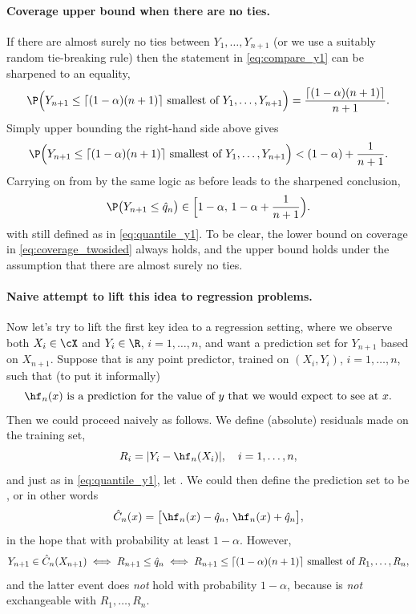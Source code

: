 \documentclass{article}
\begin{document}
\paragraph{Coverage upper bound when there are no ties.}

If there are almost surely no ties between $Y_1,\dots,Y_{n+1}$ (or we use a
suitably random tie-breaking rule) then the statement in \eqref{eq:compare_y1}
can be sharpened to an equality,  
\begin{equation}
\label{eq:compare_y3}
\P\Big( \text{$Y_{n+1} \leq \lceil (1-\alpha)(n+1) \rceil$ smallest of
  $Y_1,\dots,Y_{n+1}$} \Big) = \frac{\lceil (1-\alpha)(n+1) \rceil}{n+1}.
\end{equation}
Simply upper bounding the right-hand side above gives
\begin{equation}
\label{eq:compare_y4}
\P\Big( \text{$Y_{n+1} \leq \lceil (1-\alpha)(n+1) \rceil$ smallest of
  $Y_1,\dots,Y_{n+1}$} \Big) < (1-\alpha) + \frac{1}{n+1}.
\end{equation}
Carrying on from by the same logic as before leads to the sharpened conclusion, 
\begin{equation}
\label{eq:coverage_twosided}
\P\big( Y_{n+1} \leq \hq_n \big) \in \Big[ 1-\alpha, \, 1-\alpha + \frac{1}{n+1}
\Big).  
\end{equation}
with  still defined as in \eqref{eq:quantile_y1}. To be clear,
the lower bound on coverage in \eqref{eq:coverage_twosided} always holds, and
the upper bound holds under the assumption that there are almost surely no ties.  

\paragraph{Naive attempt to lift this idea to regression problems.} 

Now let's try to lift the first key idea to a regression setting, where we
observe both $X_i \in \cX$ and $Y_i \in \R$, $i=1,\dots,n$, and want a
prediction set for $Y_{n+1}$ based on $X_{n+1}$. Suppose that  is  
any point predictor, trained on $(X_i,Y_i)$, $i=1,\dots,n$, such that (to put it 
informally)  
\[
\text{$\hf_n(x)$ is a prediction for the value of $y$ that we would expect to
  see at $x$.}  
\]
Then we could proceed naively as follows. We define (absolute) residuals made on 
the training set,     
\[
R_i = |Y_i - \hf_n(X_i)|, \quad i=1,\dots,n,
\]
and just as in \eqref{eq:quantile_y1}, let . We could then define
the prediction set to be , or in other words
\[
\hC_n(x) = \big[ \hf_n(x) - \hq_n, \, \hf_n(x) + \hq_n \big], 
\]
in the hope that  with probability at least
$1-\alpha$. However, 
\[
Y_{n+1} \in \hat{C}_n(X_{n+1}) 
\iff R_{n+1} \leq \hat{q}_n 
\iff \text{$R_{n+1} \leq \lceil (1-\alpha)(n+1) \rceil$ smallest of
  $R_1,\dots,R_n$},   
\]
and the latter event does \emph{not} hold with probability $1-\alpha$, because
 is \emph{not} exchangeable with 
$R_1,\dots,R_n$. 
\end{document}
